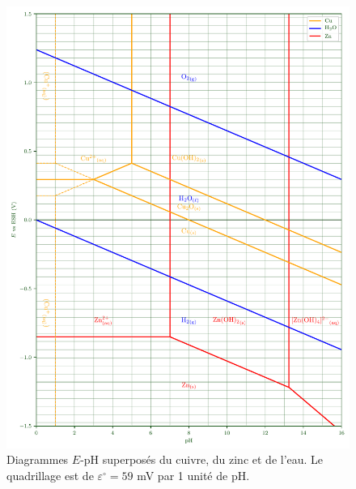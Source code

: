 \begin{solution}
    \begin{figure}[H]
        \centering
        \includegraphics[width = \linewidth]{chimiePC/gene/E-pH-Zn-sol.pdf}
        \caption{Diagrammes $E$-pH superposés du cuivre, du zinc et de l'eau. \protect\linebreak
        Le quadrillage est de $\varepsilon^\circ = 59$ mV par 1 unité de pH.}
        \label{fig:EpHS-sol}
    \end{figure}

\end{solution}